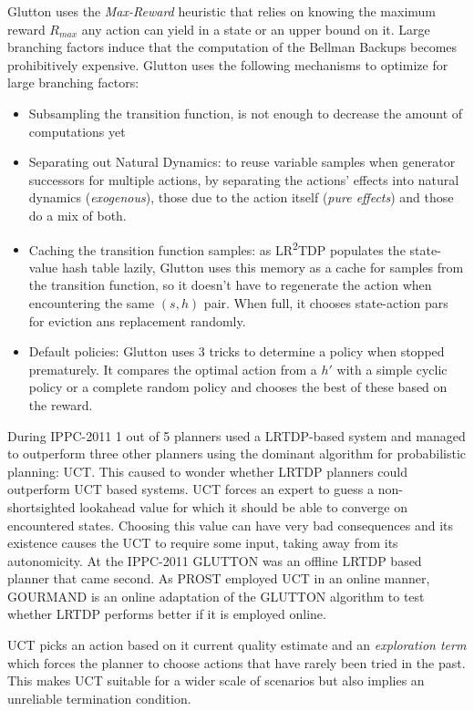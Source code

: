 \documentclass[runningheads,a4paper]{llncs}
\begin{document}
Glutton uses the \emph{Max-Reward} heuristic that relies on knowing the maximum reward $R_{max}$ any action can yield in a state or an upper bound on it. Large branching factors induce that the computation of the Bellman Backups becomes prohibitively expensive. Glutton uses the following mechanisms to optimize for large branching factors:

\begin{itemize}
	\item Subsampling the transition function, is not enough to decrease the amount of computations yet
	\item Separating out Natural Dynamics: to reuse variable samples when generator successors for multiple actions, by separating the actions' effects into natural dynamics (\emph{exogenous}), those due to the action itself (\emph{pure effects}) and those do a mix of both.
	\item Caching the transition function samples: as LR\textsuperscript{2}TDP populates the state-value hash table lazily, Glutton uses  this memory as a cache for samples from the transition function, so it doesn't have to regenerate the action when encountering the same $(s,h)$ pair. When full, it chooses state-action pars for eviction ans replacement randomly.
	\item Default policies: Glutton uses 3 tricks to determine a policy when stopped prematurely. It compares the optimal action from a $h'$ with a simple cyclic policy or a complete random policy and chooses the best of these based on the reward.
\end{itemize}
During IPPC-2011 1 out of 5 planners used a LRTDP-based system and managed to outperform three other planners using the dominant algorithm for probabilistic planning: UCT. This caused to wonder whether LRTDP planners could outperform UCT based systems.  UCT forces an expert to guess a non-shortsighted lookahead value for which it should be able to converge on encountered states. Choosing this value can have very bad consequences and its existence causes the UCT to require some input, taking away from its autonomicity. At the IPPC-2011 GLUTTON was an offline LRTDP based planner that came second. As PROST employed UCT in an online manner, GOURMAND is an online adaptation of the GLUTTON algorithm to test whether LRTDP performs better if it is employed online.

UCT picks an action based on it current quality estimate and an \emph{exploration term} which forces the planner to choose actions that have rarely been tried in the past. This makes UCT suitable for a wider scale of scenarios but also implies an unreliable termination condition.
\end{document}
